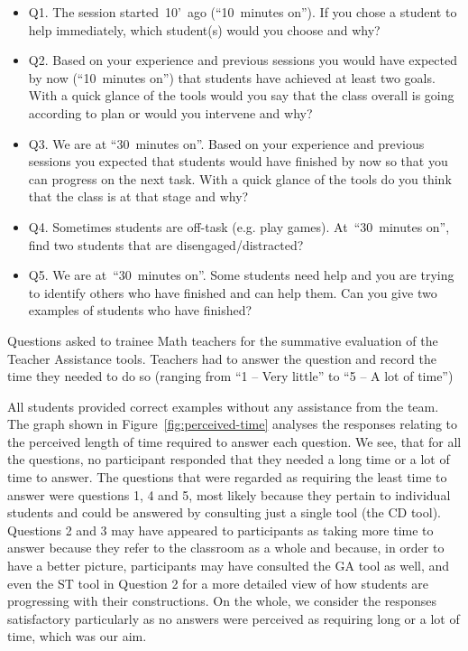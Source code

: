 \begin{table}[tb]
  \centering
  \begin{framed}
  \begin{itemize}
  \item Q1. The session started~10’~ago (“10~minutes on”). If you chose a
    student to help immediately, which student(s) would you choose and
    why?
  \item Q2. Based on your experience and previous sessions you would have
    expected by now (“10~minutes on”) that students have achieved at
    least two goals. With a quick glance of the tools would you say
    that the class overall is going according to plan or would you
    intervene and why?
  \item Q3. We are at “30~minutes on”. Based on your experience and
    previous sessions you expected that students would have finished
    by now so that you can progress on the next task. With a quick
    glance of the tools do you think that the class is at that stage
    and why?
  \item Q4. Sometimes students are off-task (e.g. play
    games). At~“30~minutes on”, find two students that are
    disengaged/distracted?
  \item Q5. We are at~“30~minutes on”. Some students need help and you are
    trying to identify others who have finished and can help them. Can
    you give two examples of students who have finished? 
  \end{itemize}    
  \end{framed}
  \vspace{-1em}
  \caption{Questions asked to trainee Math teachers for the summative
    evaluation of the Teacher Assistance tools. Teachers had to answer
    the question and record the time they needed to do so (ranging
    from ``1 -- Very little'' to ``5 -- A lot of time'')} 
  \label{fig:questions-pgce}
\end{table}

All students provided correct examples without any assistance from the
team. The graph shown in Figure~\ref{fig:perceived-time} analyses the
responses relating to the perceived length of time required to
 answer each question. We see, that for all
the questions, no participant responded that they needed a long time
or a lot of time to answer. The questions that were regarded as
requiring the least time to answer were questions 1, 4 and 5, most
likely because they pertain to individual students and could be
answered by consulting just a single tool (the CD tool). Questions 2
and 3 may have appeared to participants as taking more time to answer
because they refer to the classroom as a whole and because, in order
to have a better picture, participants may have consulted the GA tool
as well, and even the ST tool in Question 2 for a more detailed view
of how students are progressing with their constructions. On the
whole, we consider the responses satisfactory particularly as no
answers were perceived as requiring long or a lot of time, which was
our aim. 

